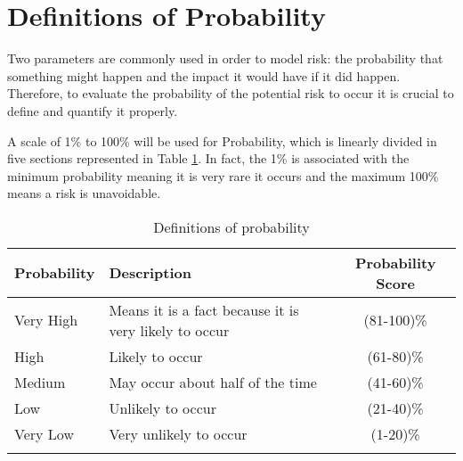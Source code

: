 \section{Definitions of Probability}
\label{3.1}
Two parameters are commonly used in order to model risk: the probability that something might happen and the impact it would have if it did happen. Therefore, to evaluate the probability of the potential risk to occur it is crucial to define and quantify it properly. 

A scale of 1\% to 100\% will be used for Probability, which is linearly divided in five sections represented in Table \ref{definitionsofprobability}. In fact, the 1\% is associated with the minimum probability meaning it is very rare it occurs and the maximum 100\% means a risk is unavoidable. 

\begin{longtable}[H]{l >{\raggedright\arraybackslash}p{7.8cm} c}
	
	\toprule[2pt]
	
	\textbf{Probability} &  \textbf{Description}  & \textbf{Probability Score} \\
	
	\midrule [1.5pt]
	\endhead
	
	Very High & Means it is a fact because it is very likely to occur & (81-100)\%
	\vspace{0.2cm} \\
	
	\midrule
	
	High & Likely to occur & (61-80)\%
	\vspace{0.2cm} \\
	
	\midrule
	
	Medium & May occur about half of the time & (41-60)\% 
	\vspace{0.2cm} \\

	\midrule

	Low & Unlikely to occur & (21-40)\% 
	\vspace{0.2cm} \\

	\midrule

	Very Low & Very unlikely to occur & (1-20)\% 
	\vspace{0.2cm} \\
		
	\bottomrule[2pt]
	
	\caption{Definitions of probability}
\label{definitionsofprobability}
\end{longtable}